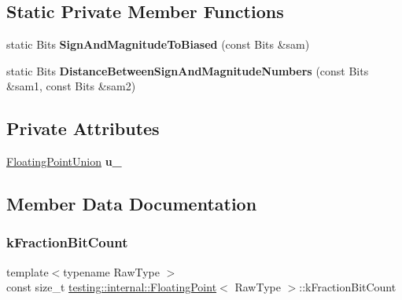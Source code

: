 \subsection*{Static Private Member Functions}
\begin{DoxyCompactItemize}
\item 
\mbox{\label{classtesting_1_1internal_1_1_floating_point_a2cf0e39c6ebf026bc0353100d031ca85}} 
static Bits {\bfseries Sign\+And\+Magnitude\+To\+Biased} (const Bits \&sam)
\item 
\mbox{\label{classtesting_1_1internal_1_1_floating_point_afe00f9f26ad2929a061f7e07b8a5071a}} 
static Bits {\bfseries Distance\+Between\+Sign\+And\+Magnitude\+Numbers} (const Bits \&sam1, const Bits \&sam2)
\end{DoxyCompactItemize}
\subsection*{Private Attributes}
\begin{DoxyCompactItemize}
\item 
\mbox{\label{classtesting_1_1internal_1_1_floating_point_a2e0b6bd427248b91476f3fca281f7104}} 
\mbox{\hyperlink{uniontesting_1_1internal_1_1_floating_point_1_1_floating_point_union}{Floating\+Point\+Union}} {\bfseries u\+\_\+}
\end{DoxyCompactItemize}


\subsection{Member Data Documentation}
\mbox{\label{classtesting_1_1internal_1_1_floating_point_a0b756a6d2a4f5f5b41ca79651c06c043}} 
\subsubsection{\texorpdfstring{k\+Fraction\+Bit\+Count}{kFractionBitCount}}
{\footnotesize\ttfamily template$<$typename Raw\+Type $>$ \\
const size\+\_\+t \mbox{\hyperlink{classtesting_1_1internal_1_1_floating_point}{testing\+::internal\+::\+Floating\+Point}}$<$ Raw\+Type $>$\+::k\+Fraction\+Bit\+Count\hspace{0.3cm}{\ttfamily [static]}}

